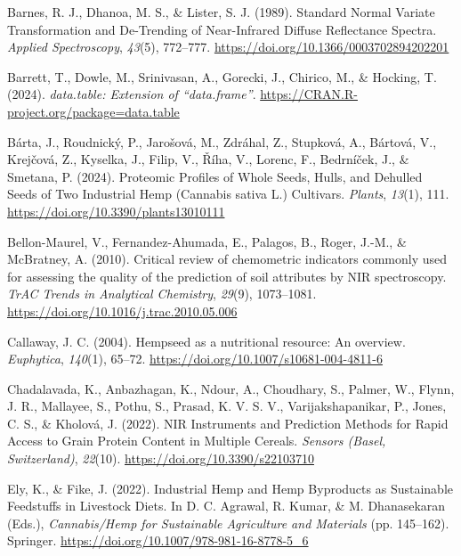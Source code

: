 \documentclass[
]{agujournal2019}
\newlength{\cslhangindent}
\newenvironment{CSLReferences}[2] %
 {\begin{list}{}{%
  \setlength{\itemindent}{0pt}
  \setlength{\leftmargin}{0pt}
  \setlength{\parsep}{0pt}
  \ifodd #1
   \setlength{\leftmargin}{\cslhangindent}
   \setlength{\itemindent}{-1\cslhangindent}
  \fi
  \setlength{\itemsep}{#2\baselineskip}}}
 {\end{list}}
\begin{document}
\label{refs}
\begin{CSLReferences}{1}{0}
\vspace{1em}

Barnes, R. J., Dhanoa, M. S., \& Lister, S. J. (1989). Standard {Normal}
{Variate} {Transformation} and {De}-{Trending} of {Near}-{Infrared}
{Diffuse} {Reflectance} {Spectra}. \emph{Applied Spectroscopy},
\emph{43}(5), 772--777. \url{https://doi.org/10.1366/0003702894202201}

Barrett, T., Dowle, M., Srinivasan, A., Gorecki, J., Chirico, M., \&
Hocking, T. (2024). \emph{{data.table}: Extension of
{``{data.frame}''}}. \url{https://CRAN.R-project.org/package=data.table}

Bárta, J., Roudnický, P., Jarošová, M., Zdráhal, Z., Stupková, A.,
Bártová, V., Krejčová, Z., Kyselka, J., Filip, V., Říha, V., Lorenc, F.,
Bedrníček, J., \& Smetana, P. (2024). Proteomic {Profiles} of {Whole}
{Seeds}, {Hulls}, and {Dehulled} {Seeds} of {Two} {Industrial} {Hemp}
({Cannabis} sativa {L}.) {Cultivars}. \emph{Plants}, \emph{13}(1), 111.
\url{https://doi.org/10.3390/plants13010111}

Bellon-Maurel, V., Fernandez-Ahumada, E., Palagos, B., Roger, J.-M., \&
McBratney, A. (2010). Critical review of chemometric indicators commonly
used for assessing the quality of the prediction of soil attributes by
{NIR} spectroscopy. \emph{TrAC Trends in Analytical Chemistry},
\emph{29}(9), 1073--1081.
\url{https://doi.org/10.1016/j.trac.2010.05.006}

Callaway, J. C. (2004). Hempseed as a nutritional resource: {An}
overview. \emph{Euphytica}, \emph{140}(1), 65--72.
\url{https://doi.org/10.1007/s10681-004-4811-6}

Chadalavada, K., Anbazhagan, K., Ndour, A., Choudhary, S., Palmer, W.,
Flynn, J. R., Mallayee, S., Pothu, S., Prasad, K. V. S. V.,
Varijakshapanikar, P., Jones, C. S., \& Kholová, J. (2022). {NIR}
{Instruments} and {Prediction} {Methods} for {Rapid} {Access} to {Grain}
{Protein} {Content} in {Multiple} {Cereals}. \emph{Sensors (Basel,
Switzerland)}, \emph{22}(10). \url{https://doi.org/10.3390/s22103710}

Ely, K., \& Fike, J. (2022). Industrial {Hemp} and {Hemp} {Byproducts}
as {Sustainable} {Feedstuffs} in {Livestock} {Diets}. In D. C. Agrawal,
R. Kumar, \& M. Dhanasekaran (Eds.), \emph{Cannabis/{Hemp} for
{Sustainable} {Agriculture} and {Materials}} (pp. 145--162). Springer.
\url{https://doi.org/10.1007/978-981-16-8778-5_6}


\end{CSLReferences}
\end{document}
